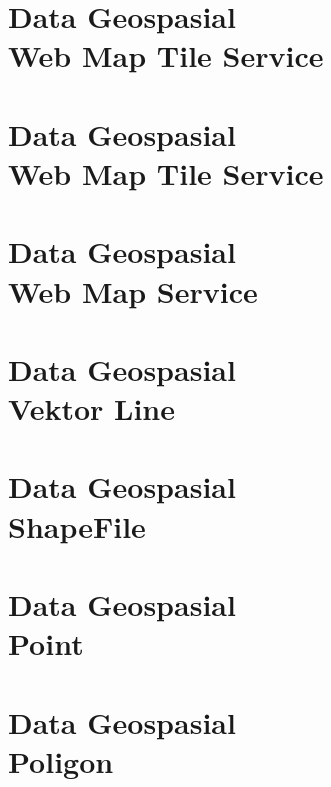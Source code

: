 \documentclass{WileySix}
\begin{document}
\chapter[Open Geospatial Consortium]
{Data Geospasial\\ Web Map Tile Service}


\chapter[Web Map Tile Service]
{Data Geospasial\\ Web Map Tile Service}


\chapter[Web Map Service]
{Data Geospasial\\ Web Map Service}


%

\chapter[Data Vektor Line]
{Data Geospasial\\ Vektor Line}


\chapter[Shapefile]
{Data Geospasial\\ ShapeFile}



\chapter[Shapefile Point]
{Data Geospasial\\ Point}


\chapter[Shapefile Poligon]
{Data Geospasial\\ Poligon}

\end{document}
